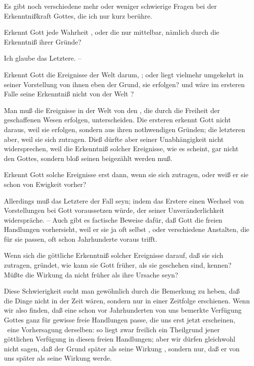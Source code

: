 \begin{aufza}
\begin{RWanm}[Anm.~1.]
\end{RWanm}
\begin{RWanm}[Anm.~2.]
Es gibt noch verschiedene mehr oder weniger schwierige Fragen bei der Erkenntnißkraft Gottes, die ich nur kurz berühre.
\begin{aufza}
\item Erkennt Gott jede Wahrheit , oder die  nur mittelbar, nämlich durch die Erkenntniß ihrer Gründe?\par
{} Ich glaube das Letztere. --
\item Erkennt Gott die Ereignisse der Welt darum, ; oder liegt vielmehr umgekehrt in seiner Vorstellung von ihnen eben der Grund,  sie erfolgen? und wäre im ersteren Falle seine Erkenntniß nicht von der Welt ?\par
{} Man muß die  Ereignisse in der Welt von den , die durch die Freiheit der geschaffenen Wesen erfolgen, unterscheiden. Die ersteren erkennt Gott nicht daraus, weil sie erfolgen, sondern aus ihren nothwendigen Gründen; die letzteren aber, weil sie sich zutragen. Dieß dürfte aber seiner Unabhängigkeit nicht widersprechen, weil die Erkenntniß solcher Ereignisse, wie es scheint, gar nicht den  Gottes, sondern bloß seinen  beigezählt werden muß.
\item Erkennt Gott solche Ereignisse erst dann, wenn sie sich zutragen, oder weiß er sie schon von Ewigkeit vorher?\par
{} Allerdings muß das Letztere der Fall seyn; indem das Erstere einen Wechsel von Vorstellungen bei Gott voraussetzen würde, der seiner Unveränderlichkeit widerspräche. -- Auch gibt es factische Beweise dafür, daß Gott die freien Handlungen vorhersieht, weil er sie ja oft selbst , oder verschiedene Anstalten, die für sie passen, oft schon Jahrhunderte voraus trifft.
\item Wenn sich die göttliche Erkenntniß solcher Ereignisse darauf, daß sie sich zutragen, gründet, wie kann sie Gott früher, als sie geschehen sind, kennen? Müßte die Wirkung da nicht früher als ihre Ursache seyn?~\par
{} Diese Schwierigkeit sucht man gewöhnlich durch die Bemerkung zu heben, daß die Dinge nicht  in der Zeit wären, sondern nur  in einer Zeitfolge erschienen. Wenn wir also finden, daß eine schon vor Jahrhunderten von uns bemerkte Verfügung Gottes ganz für gewisse freie Handlungen passe, die uns erst jetzt erscheinen, \zB\ eine Vorhersagung derselben: so liegt zwar freilich ein Theilgrund jener göttlichen Verfügung in diesen freien Handlungen; aber wir dürfen gleichwohl nicht sagen, daß der Grund später als seine Wirkung , sondern nur, daß er von uns später als seine Wirkung  werde.
\end{aufza}
\end{RWanm}
\end{aufza}

